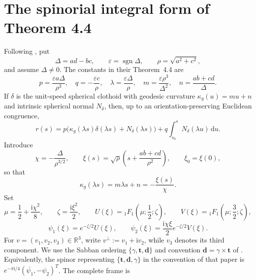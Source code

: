 \documentclass[11pt]{article}
\DeclareMathOperator{\sgn}{sgn}
\newcommand{\ii}{\mathrm i}
\newcommand{\dd}{\,\mathrm d}
\begin{document}
\section{The spinorial integral form of Theorem 4.4}
Following \cite{LucasOrtega2026}, put
\begin{equation}
\Delta=ad-bc,\qquad \varepsilon=\sgn\Delta,\qquad \rho=\sqrt{a^2+c^2}, \tag{2}
\end{equation}
and assume \(\Delta\ne0\). The constants in their Theorem~4.4 are
\begin{equation}
 p=\frac{\varepsilon a\Delta}{\rho^3},\quad
 q=-\frac{\varepsilon c}{\rho},\quad
 \lambda=\frac{\varepsilon\Delta}{\rho},\quad
 m=\frac{\varepsilon\rho^3}{\Delta^2},\quad
 n=\frac{ab+cd}{\Delta}. \tag{3}
\end{equation}
If \(\delta\) is the unit-speed spherical clothoid with geodesic curvature \(\kappa_g(u)=mu+n\) and intrinsic spherical normal \(N_\delta\), then, up to an orientation-preserving Euclidean congruence,
\begin{equation}
 r(s)=p\bigl(\kappa_g(\lambda s)\delta(\lambda s)+N_\delta(\lambda s)\bigr)
      +q\int_{s_0}^{s}N_\delta(\lambda u)\dd u. \tag{4}
\end{equation}
Introduce
\begin{equation}
 \chi=-\frac{\Delta}{\rho^{3/2}},\qquad
 \xi(s)=\sqrt\rho\left(s+\frac{ab+cd}{\rho^2}\right),\qquad \xi_0=\xi(0), \tag{5}
\end{equation}
so that
\begin{equation}
 \kappa_g(\lambda s)=m\lambda s+n=-\frac{\xi(s)}{\chi}. \tag{6}
\end{equation}
Set
\begin{equation}
 \mu=\frac12+\frac{\ii\chi^2}{8},\qquad \zeta=\frac{\ii\xi^2}{2},\qquad
 U(\xi)={}_1F_1\!\left(\mu;\frac12;\zeta\right),\qquad
 V(\xi)={}_1F_1\!\left(\mu;\frac32;\zeta\right), \tag{7}
\end{equation}
\begin{equation}
 \psi_1(\xi)=e^{-\zeta/2}U(\xi),\qquad
 \psi_2(\xi)=\frac{\ii\chi\xi}{2}e^{-\zeta/2}V(\xi). \tag{8}
\end{equation}
For \(v=(v_1,v_2,v_3)\in\mathbb R^3\), write \(v^\perp:=v_1+\ii v_2\), while \(v_3\) denotes its third component. We use the Sabban ordering
\(\{\gamma,\mathbf t,\mathbf d\}\) and convention \(\mathbf d=\gamma\times\mathbf t\) of
\cite{Senyurt2015}. Equivalently, the spinor representing
\(\{\mathbf t,\mathbf d,\gamma\}\) in the convention of that paper is
\(e^{-\pi\ii/4}(\overline{\psi_1},-\psi_2)^T\). The complete frame is
\end{document}
